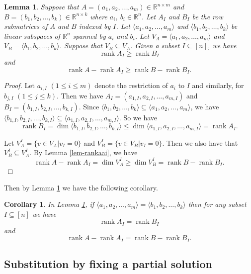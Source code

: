 \documentclass[10pt,a4paper]{amsart}
\newtheorem{corollary}[theorem]{Corollary}
\newtheorem{lemma}[theorem]{Lemma}
\numberwithin{equation}{section}
\begin{document}
\begin{lemma}\label{lem-subfull}
Suppose that $A=(a_1,a_2,\ldots,a_m)\in \mathbb{R}^{n\times m}$  and  $B=(b_1,b_2,\ldots,b_k)\in \mathbb{R}^{n\times k}$ where $a_i,~b_i\in \mathbb{R}^{n}$. Let $A_I$ and $B_I$ be the row submatrices of $A$ and $B$
indexed by $I$. Let $\langle a_1,a_2,\ldots,a_m \rangle$ and $\langle b_1,b_2,\ldots,b_k \rangle$ be linear subspaces of $\mathbb{R}^{n}$ spanned by $a_i$ and $b_i$. Let $V_A=\langle a_1,a_2,\ldots,a_m \rangle$ and 
 $V_B=\langle b_1,b_2,\ldots,b_k \rangle$. Suppose that $V_B\subseteq V_A$. Given a subset $I\subseteq [n]$, we have
$$\operatorname{rank}A_I\geq \operatorname{rank}B_I$$
and
$$\operatorname{rank}A-\operatorname{rank}A_I\geq \operatorname{rank}B-\operatorname{rank}B_I.$$
\end{lemma}
\begin{proof}
Let $a_{i,I}$ $(1\leq i\leq m)$ denote the restriction of $a_i$ to $I$ and similarly, for $b_{j,I}$ $(1\leq j\leq k)$. Then we have $A_I=(a_{1,I}, a_{2,I},\ldots,a_{m,I})$ and $B_I=(b_{1,I}, b_{2,I},\ldots,b_{k,I})$.
Since $\langle b_1,b_2,\ldots,b_k \rangle\subseteq \langle a_1,a_2,\ldots,a_m \rangle$, we have $\langle b_{1,I},b_{2,I},\ldots,
b_{k,I} \rangle\subseteq \langle a_{1,I},a_{2,I},\ldots,a_{m,I} \rangle$.
So we have
$$\operatorname{rank}B_I=\dim \langle b_{1,I},b_{2,I},\ldots,
b_{k,I} \rangle 
\leq \dim \langle a_{1,I},a_{2,I},\ldots,a_{m,I} \rangle=\operatorname{rank}A_I.$$

Let $V_A^I=\{v\in V_A| v_I=0 \}$ and $V_B^I=\{v\in V_B| v_I=0 \}$. Then we also have that $V_B^I\subseteq V_A^I$. By Lemma \ref{lem-rankaai}, we have $$ \operatorname{rank}A-\operatorname{rank}A_I=\dim V_A^I \geq \dim V_B^I=\operatorname{rank}B-\operatorname{rank}B_I.$$
\end{proof}
Then by Lemma \ref{lem-subfull} we have the following corollary.
\begin{corollary}\label{cor-subfull}
In Lemma \ref{lem-subfull},
if $\langle a_1,a_2,\ldots,a_m \rangle=\langle b_1,b_2,\ldots,b_k \rangle$ then for any subset $I\subseteq [n]$ we have
$$\operatorname{rank}A_I=\operatorname{rank}B_I$$
and  
$$\operatorname{rank}A-\operatorname{rank}A_I= \operatorname{rank}B-\operatorname{rank}B_I.$$
\end{corollary}

\subsection{Substitution by fixing a partial solution}
\
\end{document}
